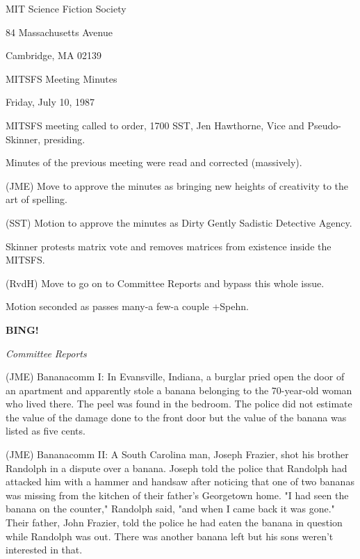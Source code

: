 \documentclass[12pt]{article}
\newcommand{\bing}{{\bf BING!} }
\newcommand{\goto}[1]{\bing \vskip 12pt \centerline{{\em{#1}}}}
\begin{document}
\begin{center}

MIT Science Fiction Society 

84 Massachusetts Avenue

Cambridge, MA 02139

\vspace{12pt}

MITSFS Meeting Minutes 

Friday, July 10, 1987

\end{center}
 
\vspace{18pt}

\setlength{\parskip}{6pt}

\noindent
MITSFS meeting called to order, 1700 SST,
Jen Hawthorne, Vice and Pseudo-Skinner, presiding.

Minutes of the previous meeting were read and corrected (massively).

(JME) Move to approve the minutes as bringing new heights of creativity to the art of spelling.

(SST) Motion to approve the minutes as Dirty Gently Sadistic Detective Agency.

Skinner protests matrix vote and removes matrices from existence inside the MITSFS.

(RvdH) Move to go on to Committee Reports and bypass this whole issue.

Motion seconded as passes many-a few-a couple +Spehn.

\goto{Committee Reports}

(JME) Bananacomm I: In Evansville, Indiana, a burglar pried open the door of an apartment and apparently stole a banana belonging to the 70-year-old woman who lived there. The peel was found in the bedroom. The police did not estimate the value of the damage done to the front door but the value of the banana was listed as five cents.

(JME) Bananacomm II: A South Carolina man, Joseph Frazier, shot his brother Randolph in a dispute over a banana. Joseph told the police that Randolph had attacked him with a hammer and handsaw after noticing that one of two bananas was missing from the kitchen of their father's Georgetown home. "I had seen the banana on the counter," Randolph said, "and when I came back it was gone." Their father, John Frazier, told the police he had eaten the banana in question while Randolph was out. There was another banana left but his sons weren't interested in that.
\end{document}
